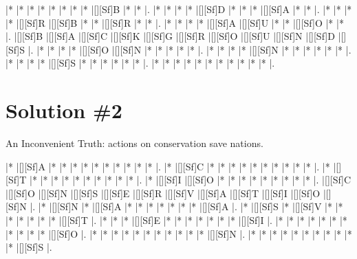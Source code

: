 \documentclass[letterpaper]{article}
\begin{document}
\vspace*{0.5cm}
\begin{Puzzle}{11}{9}
|*        |*        |*        |*        |*        |*        |*        |*        |[][Sf]B  |*        |*        |. 
|*        |*        |*        |*        |[][Sf]D  |*        |*        |*        |[][Sf]A  |*        |*        |.  
|*        |*        |*        |*        |[][Sf]R  |[][Sf]B  |*        |*        |[][Sf]R  |*        |*        |.
|*        |*        |*        |*        |[][Sf]A  |[][Sf]U  |*        |*        |[][Sf]O  |*        |*        |.  
|[][Sf]B  |[][Sf]A  |[][Sf]C  |[][Sf]K  |[][Sf]G  |[][Sf]R  |[][Sf]O  |[][Sf]U  |[][Sf]N  |[][Sf]D  |[][Sf]S  |.
|*        |*        |*        |*        |[][Sf]O  |[][Sf]N  |*        |*        |*        |*        |*        |. 
|*        |*        |*        |*        |[][Sf]N  |*        |*        |*        |*        |*        |*        |.
|*        |*        |*        |*        |[][Sf]S  |*        |*        |*        |*        |*        |*        |.
|*        |*        |*        |*        |*        |*        |*        |*        |*        |*        |*        |.
\end{Puzzle}

\newpage

\section*{Solution \#2}

An Inconvenient Truth: actions on conservation save nations.

\vspace*{0.5cm}
\begin{Puzzle}{12}{11}
|*        |[][Sf]A  |*        |*        |*        |*        |*        |*        |*        |*        |*        |*        |. 
|*        |[][Sf]C  |*        |*        |*        |*        |*        |*        |*        |*        |*        |*        |.  
|*        |[][Sf]T  |*        |*        |*        |*        |*        |*        |*        |*        |*        |*        |.
|*        |[][Sf]I  |[][Sf]O  |*        |*        |*        |*        |*        |*        |*        |*        |*        |.  
|[][Sf]C  |[][Sf]O  |[][Sf]N  |[][Sf]S  |[][Sf]E  |[][Sf]R  |[][Sf]V  |[][Sf]A  |[][Sf]T  |[][Sf]I  |[][Sf]O  |[][Sf]N  |.
|*        |[][Sf]N  |*        |[][Sf]A  |*        |*        |*        |*        |*        |*        |*        |[][Sf]A  |. 
|*        |[][Sf]S  |*        |[][Sf]V  |*        |*        |*        |*        |*        |*        |*        |[][Sf]T  |.
|*        |*        |*        |[][Sf]E  |*        |*        |*        |*        |*        |*        |*        |[][Sf]I  |.
|*        |*        |*        |*        |*        |*        |*        |*        |*        |*        |*        |[][Sf]O  |.
|*        |*        |*        |*        |*        |*        |*        |*        |*        |*        |*        |[][Sf]N  |.
|*        |*        |*        |*        |*        |*        |*        |*        |*        |*        |*        |[][Sf]S  |.
\end{Puzzle}
\end{document}
